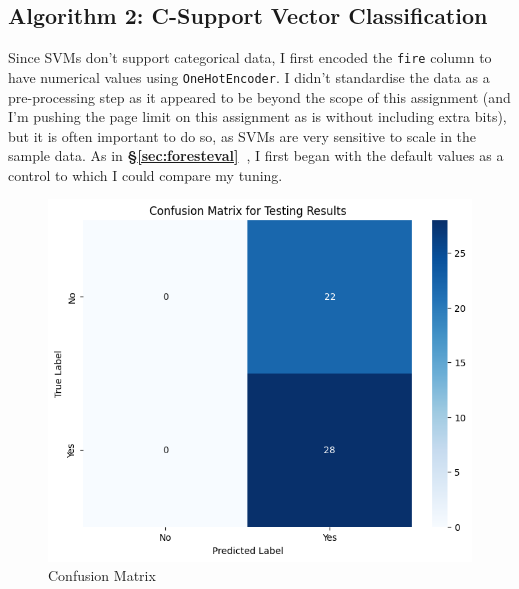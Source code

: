\documentclass[a4paper, 10pt]{article}
\newcommand{\secref}[1]{\textbf{§\ref{#1}~\nameref{#1}}}
\begin{document}
\subsection{Algorithm 2: C-Support Vector Classification}
Since SVMs don't support categorical data, I first encoded the \texttt{fire} column to have numerical values using \texttt{OneHotEncoder}.
I didn't standardise the data as a pre-processing step as it appeared to be beyond the scope of this assignment (and I'm pushing the page limit on this assignment as is without including extra bits), but it is often important to do so, as SVMs are very sensitive to scale in the sample data.
As in \secref{sec:foresteval}, I first began with the default values as a control to which I could compare my tuning.

\begin{minipage}{0.45\textwidth} 
\begin{figure}[H]
    \centering
    \includegraphics[width=\textwidth]{./images/svc_confusion.png}
    \caption{Confusion Matrix}
\end{figure}
\end{minipage}\hspace{0.05\textwidth}
\end{document}
